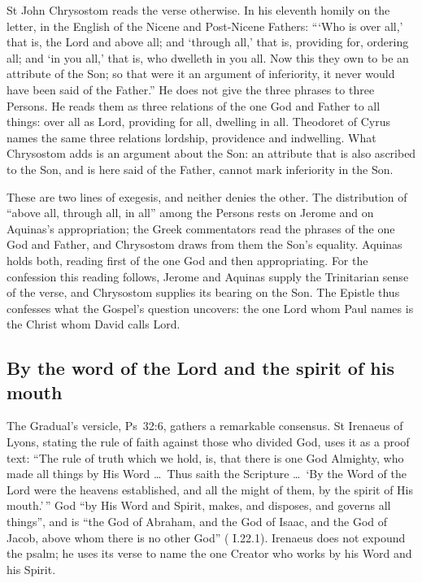 St John Chrysostom reads the verse otherwise. In his eleventh homily on the
letter, in the English of the Nicene and Post-Nicene Fathers: ```Who is over
all,' that is, the Lord and above all; and `through all,' that is, providing
for, ordering all; and `in you all,' that is, who dwelleth in you all. Now this
they own to be an attribute of the Son; so that were it an argument of
inferiority, it never would have been said of the Father.'' He does not give
the three phrases to three Persons. He reads them as three relations of the
one God and Father to all things: over all as Lord, providing for all,
dwelling in all. Theodoret of Cyrus names the same three relations lordship,
providence and indwelling. What Chrysostom adds is an argument about the Son:
an attribute that is also ascribed to the Son, and is here said of the Father,
cannot mark inferiority in the Son.

These are two lines of exegesis, and neither denies the other. The
distribution of ``above all, through all, in all'' among the Persons rests on
Jerome and on Aquinas's appropriation; the Greek commentators read the phrases
of the one God and Father, and Chrysostom draws from them the Son's equality.
Aquinas holds both, reading first of the one God and then appropriating. For
the confession this reading follows, Jerome and Aquinas supply the Trinitarian
sense of the verse, and Chrysostom supplies its bearing on the Son. The Epistle
thus confesses what the Gospel's question uncovers: the one Lord whom Paul
names is the Christ whom David calls Lord.

\subsection{By the word of the Lord and the spirit of his mouth}

The Gradual's versicle, Ps~32:6, gathers a remarkable consensus.
St Irenaeus of Lyons, stating the rule of faith against those who divided God,
uses it as a proof text: ``The rule of truth which we hold, is, that there is
one God Almighty, who made all things by His Word \dots\ Thus saith the
Scripture \dots\ `By the Word of the Lord were the heavens established, and
all the might of them, by the spirit of His mouth.'\,'' God ``by His Word and
Spirit, makes, and disposes, and governs all things'', and is ``the God of
Abraham, and the God of Isaac, and the God of Jacob, above whom there is no
other God'' ( I.22.1). Irenaeus does not expound the
psalm; he uses its verse to name the one Creator who works by his Word and his
Spirit.


